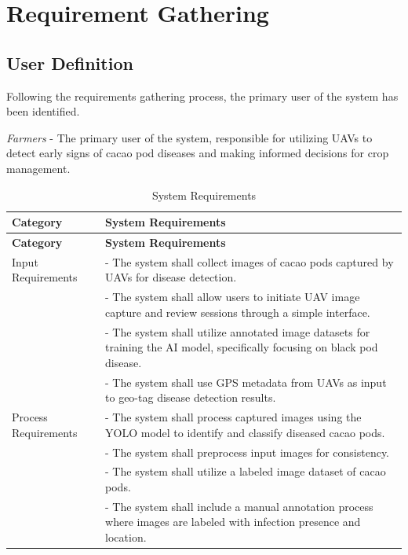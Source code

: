 	\section{Requirement Gathering}
	
	\subsection{User Definition} 
	
	Following the requirements gathering process, the primary user of the system has been identified. 
	
	\textit{Farmers} - The primary user of the system, responsible for utilizing UAVs to detect early signs of cacao pod diseases and making informed decisions for crop management.
	
    \begin{longtable}{p{4cm} p{8cm}}
    	\caption{System Requirements} \label{tab:sysreq} \\
    	
    	\toprule
    	\textbf{Category} & \textbf{System Requirements} \\
    	\midrule
    	\endfirsthead
    	
    	\toprule
    	\textbf{Category} & \textbf{System Requirements} \\
    	\midrule
    	\endhead
    	
    	\bottomrule
    	\endfoot
    	
    	Input Requirements & - The system shall collect images of cacao pods captured by UAVs for disease detection. \\
    	& - The system shall allow users to initiate UAV image capture and review sessions through a simple interface. \\
    	& - The system shall utilize annotated image datasets for training the AI model, specifically focusing on black pod disease. \\
    	& - The system shall use GPS metadata from UAVs as input to geo-tag disease detection results. \\
    	\midrule
    	
    	Process Requirements & - The system shall process captured images using the YOLO model to identify and classify diseased cacao pods. \\
    	& - The system shall preprocess input images for consistency. \\
    	& - The system shall utilize a labeled image dataset of cacao pods. \\
    	& - The system shall include a manual annotation process where images are labeled with infection presence and location. \\
    	\midrule
    	

\end{longtable}
